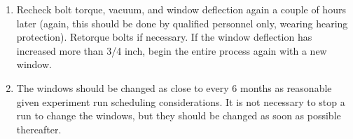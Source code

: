 {{\begin{enumerate}
\item{Recheck bolt torque, vacuum, and window deflection
again a couple of hours later (again, this should be done by
qualified personnel only, wearing hearing
protection). Retorque bolts if necessary.
If the window deflection has increased more than 3/4 inch, begin the entire
process again with a new window.}

\item{The windows should be changed as close to every 6 months as
reasonable given experiment run scheduling considerations. It is not
necessary to stop a run to change the windows, but they should be changed
as soon as possible thereafter.}

\end{enumerate}
} %


}
